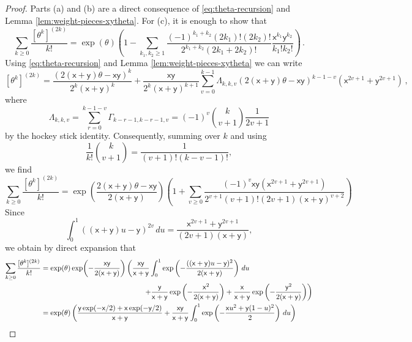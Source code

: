 \documentclass[11pt]{article}
\theoremstyle{definition}
\begin{document}
\begin{proof}
Parts (a) and (b) are a direct consequence of \eqref{eq:theta-recursion} and Lemma \ref{lem:weight-pieces-xytheta}. For (c), it is enough to show that
\begin{equation}\label{eq:goalll}
    \sum_{k \geq 0} \frac{[\theta^k]^{(2k)}}{k!} = \exp(\theta)\left(1-
    \sum_{k_1,k_2\ge 1} \frac{(-1)^{k_1+k_2}(2k_1)!(2k_2)!}{2^{k_1+k_2}(2k_1+2k_2)!}
    \frac{\mathsf{x}^{k_1}\mathsf{y}^{k_2}}{k_1!k_2!}\right)\, .
\end{equation}
Using \eqref{eq:theta-recursion} and Lemma \ref{lem:weight-pieces-xytheta} we can write
$$
[\theta^k]^{(2k)} = \frac{(2(\mathsf{x}+\mathsf{y})\theta -\mathsf{x}\mathsf{y})^k}{2^k(\mathsf{x}+\mathsf{y})^k} + \frac{\mathsf{x}\mathsf{y}}{2^k(\mathsf{x}+\mathsf{y})^{k+1}}\sum_{v=0}^{k-1}\Lambda_{k,k,v}(2(\mathsf{x}+\mathsf{y})\theta-\mathsf{x}\mathsf{y})^{k-1-v}(\mathsf{x}^{2v+1}+\mathsf{y}^{2v+1})\, ,
$$
where
$$
\Lambda_{k,k,v} = \sum_{r=0}^{k-1-v}\Gamma_{k-r-1, k-r-1, v} = (-1)^v\binom{k}{v+1}\frac{1}{2v+1}
$$
by the hockey stick identity. Consequently, summing over $k$ and using
\[
\frac{1}{k!}\binom{k}{v+1}
=
\frac{1}{(v+1)!(k-v-1)!},
\]
we find
$$
\sum_{k\geq 0}\frac{[\theta^k]^{(2k)}}{k!}
=
\exp\!\left(\frac{2(\mathsf{x}+\mathsf{y})\theta-\mathsf{x}\mathsf{y}}{2(\mathsf{x}+\mathsf{y})}\right)\left(1+\sum_{v\geq 0}\frac{(-1)^v\mathsf{x}\mathsf{y}(\mathsf{x}^{2v+1}+\mathsf{y}^{2v+1})}{2^{v+1}(v+1)!(2v+1)(\mathsf{x}+\mathsf{y})^{v+2}}\right)
$$
Since
$$
\int_0^1((\mathsf{x}+\mathsf{y})u-\mathsf{y})^{2v}\,du=\frac{\mathsf{x}^{2v+1}+\mathsf{y}^{2v+1}}{(2v+1)(\mathsf{x}+\mathsf{y})},
$$
we obtain by direct expansion that
\begin{align}\label{eq:thetamidddle}
\sum_{k\geq 0}\frac{[\theta^k]^{(2k)}}{k!} &=\exp(\theta)\exp\!\left(-\frac{\mathsf{x}\mathsf{y}}{2(\mathsf{x}+\mathsf{y})}\right)\left(\frac{\mathsf{x}\mathsf{y}}{\mathsf{x}+\mathsf{y}}
\int_0^1
\exp\left(-\frac{((\mathsf{x}+\mathsf{y})u-\mathsf{y})^2}{2(\mathsf{x}+\mathsf{y})}\right)\,du\right.\notag\\
&\hspace{5cm}\left.+ \frac{\mathsf{y}}{\mathsf{x}+\mathsf{y}}
\exp\left(-\frac{\mathsf{x}^2}{2(\mathsf{x}+\mathsf{y})}\right)
+\frac{\mathsf{x}}{\mathsf{x}+\mathsf{y}}\exp\left(-\frac{\mathsf{y}^2}{2(\mathsf{x}+\mathsf{y})}\right)\right)\notag\\
&=\exp(\theta)\left(\frac{\mathsf{y}\exp(-\mathsf{x}/2) + \mathsf{x}\exp(-\mathsf{y}/2)}{\mathsf{x}+\mathsf{y}} + \frac{\mathsf{x}\mathsf{y}}{\mathsf{x}+\mathsf{y}}\int_0^1 \exp\left(-\frac{\mathsf{x}u^2 + \mathsf{y}(1-u)^2}{2}\right)\, du\right)

\end{align}
\end{proof}
\end{document}
